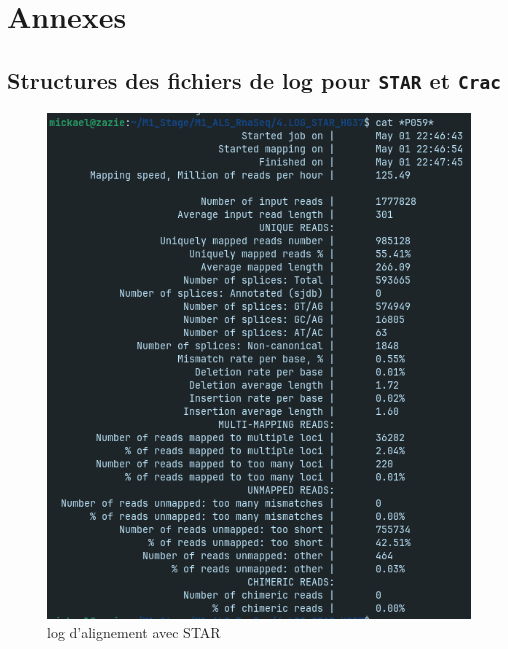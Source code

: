 \section{Annexes}
\subsection{Structures des fichiers de log pour \texttt{STAR} et \texttt{Crac}}
\label{annexe:format_log} 
\begin{figure}[H]
  \centering
  \begin{minipage}[b]{0.48\textwidth}
    \centering
    \includegraphics[width=\linewidth]{STAR_log.png}
    \caption*{log d'alignement avec STAR}
  \end{minipage}
  \hfill
  \begin{minipage}[b]{0.48\textwidth}
    \centering

\end{minipage}
\end{figure}
